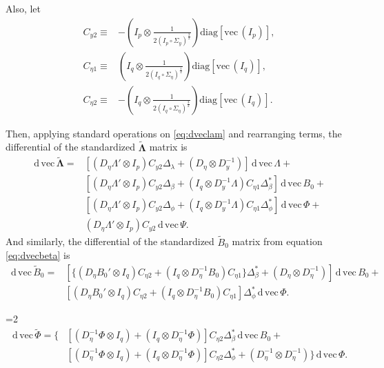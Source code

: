 \documentclass[a4paper, 11pt]{article}
\newcommand{\n}{\eta}
\renewcommand{\l}{\lambda}
\renewcommand{\b}{\beta}
\newcommand{\p}{\phi}
\renewcommand{\d}{\,\mathrm{d}\,}
\newcommand{\definedas}{\equiv}
\newcommand{\kronprod}{\otimes}
\newcommand{\hadaprod}{\circ}
\newcommand{\diag}{\mathrm{diag}}
\renewcommand{\vec}{\mathrm{vec}\,}
\newcommand{\Lambdastan}{\boldsymbol{\tilde{\Lambda}}}
\newcommand{\Bstan}{\tilde{B}}
\newcommand{\Phistan}{\tilde{\Phi}}
\newcommand{\0}{\boldsymbol{0}}
\begin{document}
Also, let
\begin{align}
    C_{y2} \definedas&
        - (I_p \kronprod \frac{1}{2 (I_p \hadaprod \Sigma_y)^{\frac{3}{2}}})
        \diag[\vec(I_p)],
\\
    C_{\n1} \definedas&
        (I_q \kronprod \frac{1}{2 (I_q \hadaprod \Sigma_\n)^{\frac{1}{2}}})
        \diag[\vec(I_q)],
\\
    C_{\n2} \definedas&
        - (I_q \kronprod \frac{1}{2 (I_q \hadaprod \Sigma_\n)^{\frac{3}{2}}})
        \diag[\vec(I_q)].
\end{align}

Then, applying standard operations on \ref{eq:dveclam} and rearranging terms,
the differential of the standardized $\Lambdastan$ matrix is
\begin{equation}\label{eq:dveclam_final}
\begin{split}
  \d\vec\Lambdastan = 
     & [(D_\n \Lambda' \kronprod I_p) C_{y2} \Delta_\l + 
        (D_\n \kronprod D_y^{-1})] 
        \d\vec\Lambda +\\
     & [(D_\n \Lambda' \kronprod I_p) C_{y2} \Delta_\b + 
        (I_q \kronprod D_y^{-1}\Lambda) C_{\n1} \Delta^*_\b ] 
        \d\vec B_0 +\\
     & [(D_\n \Lambda' \kronprod I_p) C_{y2} \Delta_\p + 
        (I_q \kronprod D_y^{-1}\Lambda) C_{\n1} \Delta^*_\p ] 
        \d\vec \Phi +\\
     & (D_\n \Lambda' \kronprod I_p) C_{y2} 
        \d\vec \Psi.
\end{split}\end{equation}
And similarly, the differential of the standardized $\Bstan_0$ matrix from
equation \ref{eq:dvecbeta} is
\begin{equation}\label{eq:dvecbeta_final}
\begin{split}
  \d\vec \Bstan_0 =
     & [\{(D_\n B_0' \kronprod I_q) C_{\n2}  + 
        (I_q \kronprod D_\n^{-1}B_0) C_{\n1} \} \Delta^*_\b +
           (D_\n \kronprod D_\n^{-1})  ] 
        \d\vec B_0 +\\
     & [(D_\n B_0' \kronprod I_q) C_{\n2}  + 
        (I_q \kronprod D_\n^{-1}B_0) C_{\n1} ] \Delta^*_\p 
        \d\vec \Phi.
\end{split}\end{equation}

=2
\begin{equation}\label{eq:dvecphi_final}
\begin{split}
  \d\vec \Phistan = \{
     & [  (D^{-1}_\n \Phi \kronprod I_q)  + (I_q \kronprod D_\n^{-1}\Phi)  ] C_{\n2} \Delta^*_\b        \d\vec B_0 +\\
     & [(D^{-1}_\n \Phi \kronprod I_q)  + (I_q \kronprod D_\n^{-1}\Phi)  ]  C_{\n2} \Delta^*_\p   +    (D_\n^{-1} \kronprod D_\n^{-1})
     \}   \d\vec \Phi.
\end{split}\end{equation}
\end{document}
